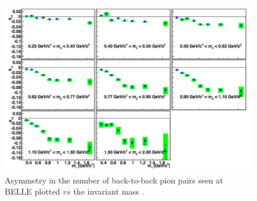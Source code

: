 \documentclass[letterpaper, abstract = on,listof=totoc, bibliography=totoc]{scrreprt}
\begin{document}
 \begin{figure}
\begin{center}
\includegraphics[width = .7\textwidth]{BelleAnnModulationM}
\caption[Asymmetry seen in $e^-e^+$ annihilation at BELLE]{Asymmetry in the number of back-to-back pion pairs seen at BELLE plotted $vs$ the invariant mass \cite{belleIFF}.}
\label{fig:BelleMod}
\end{center}
\end{figure}
\end{document}

